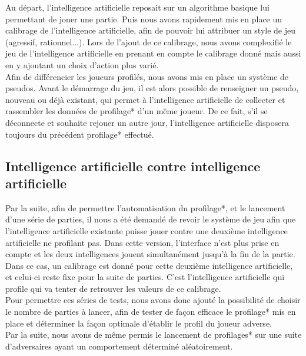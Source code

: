 \documentclass{report}
\begin{document}
Au départ, l'intelligence artificielle reposait sur un algorithme basique lui permettant de jouer une partie. Puis nous avons rapidement mis en place un calibrage de l'intelligence artificielle, afin de pouvoir lui attribuer un style de jeu (agressif, rationnel...). Lors de l'ajout de ce calibrage, nous avons complexifié le jeu de l'intelligence artificielle en prenant en compte le calibrage donné mais aussi en y ajoutant un choix d'action plus varié.\\

Afin de différencier les joueurs profilés, nous avons mis en place un système de pseudos. Avant le démarrage du jeu, il est alors possible de renseigner un pseudo, nouveau ou déjà existant, qui permet à l'intelligence artificielle de collecter et rassembler les données de profilage* d'un même joueur. De ce fait, s'il se déconnecte et souhaite rejouer un autre jour, l'intelligence artificielle disposera toujours du précédent profilage* effectué.\par

\subsection{Intelligence artificielle contre intelligence artificielle}
\hspace{0.5cm}Par la suite, afin de permettre l'automatisation du profilage*, et le lancement d'une série de parties, il nous a été demandé de revoir le système de jeu afin que l'intelligence artificielle existante puisse jouer contre une deuxième intelligence artificielle ne profilant pas. Dans cette version, l'interface n'est plus prise en compte et les deux intelligences jouent simultanément jusqu'à la fin de la partie. Dans ce cas, un calibrage est donné pour cette deuxième intelligence artificielle, et celui-ci reste fixe pour la suite de parties. C'est l'intelligence artificielle qui profile qui va tenter de retrouver les valeurs de ce calibrage.\\

Pour permettre ces séries de tests, nous avons donc ajouté la possibilité de choisir le nombre de parties à lancer, afin de tester de façon efficace le profilage* mis en place et déterminer la façon optimale d'établir le profil du joueur adverse.\\

Par la suite, nous avons de même permis le lancement de profilages* sur une suite d'adversaires ayant un comportement déterminé aléatoirement.
\end{document}
